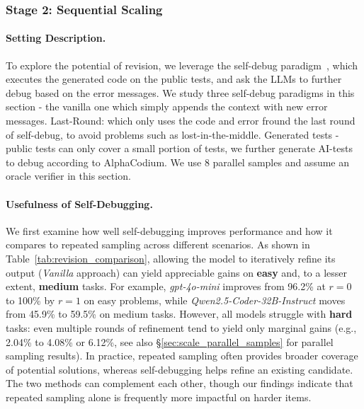 \subsubsection{Stage 2: Sequential Scaling}
\label{sec:scale_revision}

\paragraph{Setting Description.}
To explore the potential of revision, we leverage the self-debug paradigm~\citep{chen2023teaching}, which executes the generated code on the public tests, and ask the LLMs to further debug based on the error messages. We study three self-debug paradigms in this section - the vanilla one which simply appends the context with new error messages. Last-Round: which only uses the code and error fround the last round of self-debug, to avoid problems such as lost-in-the-middle. Generated tests - public tests can only cover a small portion of tests, we further generate AI-tests to debug according to AlphaCodium. We use 8 parallel samples and assume an oracle verifier in this section.

\paragraph{Usefulness of Self-Debugging.}
We first examine how well self-debugging improves performance and how it compares to repeated sampling across different scenarios. As shown in Table~\ref{tab:revision_comparison}, allowing the model to iteratively refine its output (\emph{Vanilla} approach) can yield appreciable gains on \textbf{easy} and, to a lesser extent, \textbf{medium} tasks. For example, \textit{gpt-4o-mini} improves from 96.2\% at \(r=0\) to 100\% by \(r=1\) on easy problems, while \textit{Qwen2.5-Coder-32B-Instruct} moves from 45.9\% to 59.5\% on medium tasks. However, all models struggle with \textbf{hard} tasks: even multiple rounds of refinement tend to yield only marginal gains (e.g., 2.04\% to 4.08\% or 6.12\%, see also \S\ref{sec:scale_parallel_samples} for parallel sampling results). In practice, repeated sampling often provides broader coverage of potential solutions, whereas self-debugging helps refine an existing candidate. The two methods can complement each other, though our findings indicate that repeated sampling alone is frequently more impactful on harder items.


